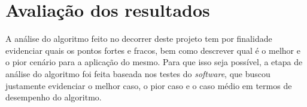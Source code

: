 \section{\textbf{Avaliação dos resultados}}
\label{ref_avaliacao_dos_resultados}
A análise do algoritmo feito no decorrer deste projeto tem por finalidade evidenciar quais os pontos fortes e fracos, bem como descrever qual é o melhor e o pior cenário para a aplicação do mesmo. Para que isso seja possível, a etapa de análise do algoritmo foi feita baseada nos testes do \textit{software}, que buscou justamente evidenciar o melhor caso, o pior caso e o caso médio em termos de desempenho do algoritmo.





